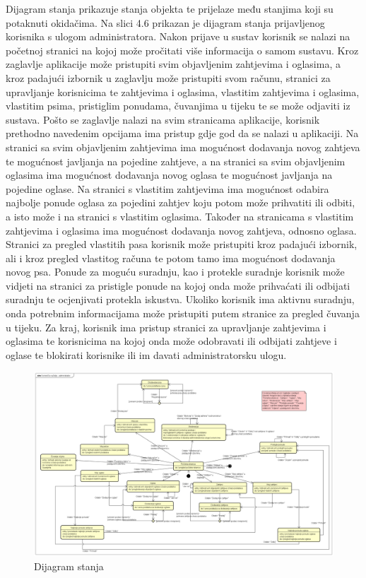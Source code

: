 			Dijagram stanja prikazuje stanja objekta te prijelaze među stanjima koji su potaknuti okidačima. Na slici 4.6 prikazan je dijagram stanja prijavljenog korisnika s ulogom administratora. Nakon prijave u sustav korisnik se nalazi na početnoj stranici na kojoj može pročitati više informacija o samom sustavu. Kroz zaglavlje aplikacije može pristupiti svim objavljenim zahtjevima i oglasima, a kroz padajući izbornik u zaglavlju može pristupiti svom računu, stranici za upravljanje korisnicima te zahtjevima i oglasima, vlastitim zahtjevima i oglasima, vlastitim psima, pristiglim ponudama, čuvanjima u tijeku te se može odjaviti iz sustava. Pošto se zaglavlje nalazi na svim stranicama aplikacije, korisnik prethodno navedenim opcijama ima pristup gdje god da se nalazi u aplikaciji. Na stranici sa svim objavljenim zahtjevima ima mogućnost dodavanja novog zahtjeva te mogućnost javljanja na pojedine zahtjeve, a na stranici sa svim objavljenim oglasima ima mogućnost dodavanja novog oglasa te mogućnost javljanja na pojedine oglase. Na stranici s vlastitim zahtjevima ima mogućnost odabira najbolje ponude oglasa za pojedini zahtjev koju potom može prihvatiti ili odbiti, a isto može i na stranici s vlastitim oglasima. Također na stranicama s vlastitim zahtjevima i oglasima ima mogućnost dodavanja novog zahtjeva, odnosno oglasa. Stranici za pregled vlastitih pasa korisnik može pristupiti kroz padajući izbornik, ali i kroz pregled vlastitog računa te potom tamo ima mogućnost dodavanja novog psa. Ponude za moguću suradnju, kao i protekle suradnje korisnik može vidjeti na stranici za pristigle ponude na kojoj onda može prihvaćati ili odbijati suradnju te ocjenjivati protekla iskustva. Ukoliko korisnik ima aktivnu suradnju, onda potrebnim informacijama može pristupiti putem stranice za pregled čuvanja u tijeku. Za kraj, korisnik ima pristup stranici za upravljanje zahtjevima i oglasima te korisnicima na kojoj onda može odobravati ili odbijati zahtjeve i oglase te blokirati korisnike ili im davati administratorsku ulogu. 
			
			
			\begin{figure}[htb]
				\centering
				\includegraphics[width=15cm]{slike/Dijagram stanja}
				\caption{Dijagram stanja}
				\label{fig:State-Diagram}
			\end{figure}
			
